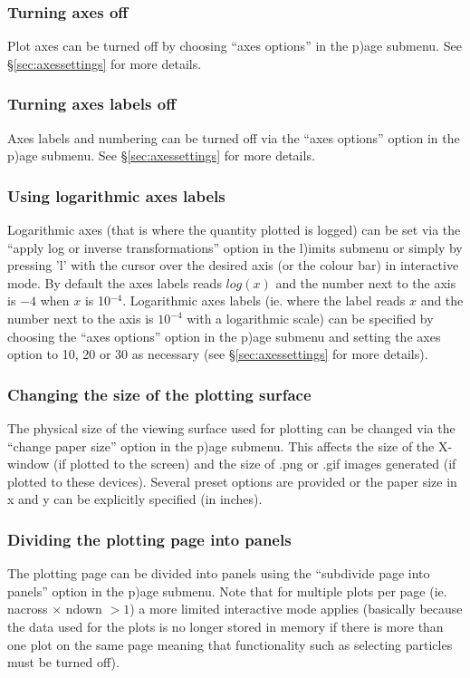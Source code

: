 \documentclass[a4paper,11pt]{article}
\begin{document}
\subsubsection{ Turning axes off}
 Plot axes can be turned off by choosing ``axes options'' in the p)age submenu. See \S\ref{sec:axessettings} for more details. 

\subsubsection{ Turning axes labels off}
 Axes labels and numbering can be turned off via the ``axes options'' option in the p)age submenu. See \S\ref{sec:axessettings} for more details. 

\subsubsection{ Using logarithmic axes labels}
\label{sec:loglabels}
 Logarithmic axes (that is where the quantity plotted is logged) can be set via the ``apply log or inverse transformations'' option in the l)imits submenu or simply by pressing 'l' with the cursor over the desired axis (or the colour bar) in interactive mode. By default the axes labels reads $log(x)$ and the number next to the axis is $-4$ when $x$ is 10$^{-4}$. Logarithmic axes labels (ie. where the label reads $x$ and the number next to the axis is $10^{-4}$ with a logarithmic scale) can be specified by choosing the ``axes options'' option in the p)age submenu and setting the axes option to 10, 20 or 30 as necessary (see \S\ref{sec:axessettings} for more details). 

\subsubsection{ Changing the size of the plotting surface}
\label{sec:papersize}
 The physical size of the viewing surface used for plotting can be changed via the ``change paper size'' option in the p)age submenu. This affects the size of the X-window (if plotted to the screen) and the size of .png or .gif images generated (if plotted to these devices). Several preset options are provided or the paper size in x and y can be explicitly specified (in inches).

\subsubsection{ Dividing the plotting page into panels}
The plotting page can be divided into panels using the ``subdivide page into panels'' option in the p)age submenu. Note that for multiple plots per page (ie. nacross $\times$ ndown $> 1$) a more limited interactive mode applies (basically because the data used for the plots is no longer stored in memory if there is more than one plot on the same page meaning that functionality such as selecting particles must be turned off).
\end{document}
